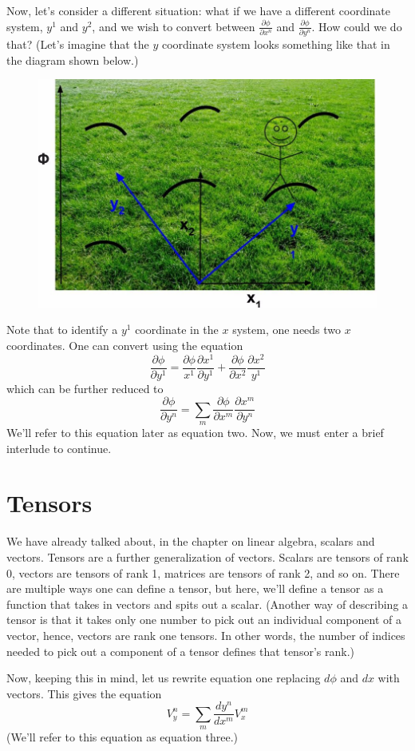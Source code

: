 Now, let's consider a different situation: what if we have a different coordinate system, $y^1$ and $y^2$, and we wish to convert between $\frac{\partial\phi}{\partial x^n}$ and $\frac{\partial\phi}{\partial y^n}$. How could we do that? (Let's imagine that the $y$ coordinate system looks something like that in the diagram shown below.)
\begin{figure}[H]
    \centering
    \includegraphics{newcor.jpg}
\end{figure}
Note that to identify a $y^1$ coordinate in the $x$ system, one needs two $x$ coordinates. One can convert using the equation 
\begin{equation*}
    \frac{\partial\phi}{\partial y^1}=\frac{\partial\phi}{x^1}\frac{\partial x^1}{\partial y^1}+\frac{\partial\phi}{\partial x^2}\frac{\partial x^2}{y^1}
\end{equation*}
which can be further reduced to
\begin{equation}
    \frac{\partial\phi}{\partial y^n}=\sum\limits_m\frac{\partial\phi}{\partial x^m}\frac{\partial x^m}{\partial y^n}
\end{equation}
We'll refer to this equation later as equation two. Now, we must enter a brief interlude to continue.
\section{Tensors}
We have already talked about, in the chapter on linear algebra, scalars and vectors. Tensors are a further generalization of vectors. Scalars are tensors of rank 0, vectors are tensors of rank 1, matrices are tensors of rank 2, and so on. There are multiple ways one can define a tensor, but here, we'll define a tensor as a function that takes in vectors and spits out a scalar. (Another way of describing a tensor is that it takes only one number to pick out an individual component of a vector, hence, vectors are rank one tensors. In other words, the number of indices needed to pick out a component of a tensor defines that tensor's rank.)

Now, keeping this in mind, let us rewrite equation one replacing $d\phi$ and $dx$ with vectors. This gives the equation
\begin{equation}
    V^n_y=\sum\limits_m\frac{dy^n}{dx^m}V^m_x
\end{equation}
(We'll refer to this equation as equation three.) 
